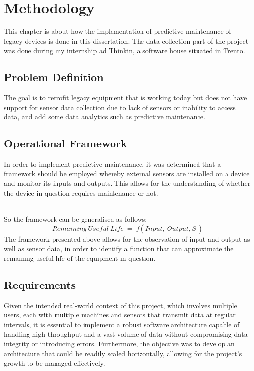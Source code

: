 \chapter{Methodology}
\label{cha:789}
This chapter is about how the implementation of predictive maintenance of legacy devices is done in this dissertation. The data collection part of the project was done during my internship ad Thinkin, a software house situated in Trento.
\section{Problem Definition}
The goal is to retrofit legacy equipment that is working today but does not have support for sensor data collection due to lack of sensors or inability to access data, and add some data analytics such as predictive maintenance.
\section{Operational Framework}
In order to implement predictive maintenance, it was determined that a framework should be employed whereby external sensors are installed on a device and monitor its inputs and outputs. This allows for the understanding of whether the device in question requires maintenance or not.\\
	\begin{figure}[h!]
    \centerline{}
  	\end{figure}
  	\\So the framework can be generalised as follows:
  	\[Remaining\ Useful\ Life\ =\ f(Input,\ Output, \overline{S}\ )\]
  	The framework presented above allows for the observation of input and output as well as sensor data, in order to identify a function that can approximate the remaining useful life of the equipment in question.
\section{Requirements}
Given the intended real-world context of this project, which involves multiple users, each with multiple machines and sensors that transmit data at regular intervals, it is essential to implement a robust software architecture capable of handling high throughput and a vast volume of data without compromising data integrity or introducing errors. Furthermore, the objective was to develop an architecture that could be readily scaled horizontally, allowing for the project's growth to be managed effectively. 

